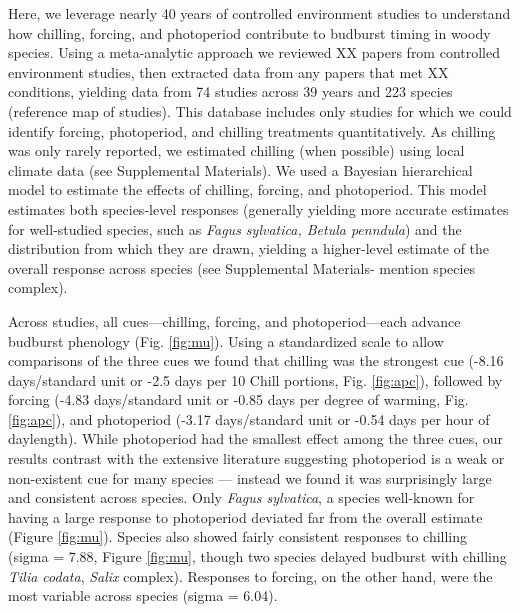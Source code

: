 \documentclass{article}
\begin{document}
\par Here, we leverage nearly 40 years of controlled environment studies to understand how chilling, forcing, and photoperiod contribute to budburst timing in woody species. Using a meta-analytic approach we reviewed XX papers from controlled environment studies, then extracted data from any papers that met XX conditions, yielding data from 74 studies across 39 years and 223 species (reference map of studies).  This database includes only studies for which we could identify forcing, photoperiod, and chilling treatments quantitatively. As chilling was only rarely reported, we estimated chilling (when possible) using local climate data (see Supplemental Materials). We used a Bayesian hierarchical model to estimate the effects of chilling, forcing, and photoperiod. This model estimates both species-level responses (generally yielding more accurate estimates for well-studied species, such as \emph{Fagus sylvatica, Betula penndula}) and the distribution from which they are drawn, yielding a higher-level estimate of the overall response across species (see Supplemental Materials- mention species complex).\\ %


\par Across studies, all cues---chilling, forcing, and photoperiod---each advance budburst phenology (Fig. \ref {fig:mu}). Using a standardized scale to allow comparisons of the three cues we found that chilling was the strongest cue (-8.16 days/standard unit or -2.5 days per 10 Chill portions, Fig. \ref {fig:apc}), followed by forcing (-4.83 days/standard unit or -0.85 days per degree of warming, Fig. \ref {fig:apc}), and photoperiod (-3.17 days/standard unit or -0.54 days per hour of daylength). While photoperiod had the smallest effect among the three cues, our results contrast with the extensive literature suggesting photoperiod is a weak or non-existent cue for many species \citep{zohner2016,koerner2010a}--- instead we found it was surprisingly large and consistent across species. Only \emph{Fagus sylvatica}, a species well-known for having a large response to photoperiod deviated far from the overall estimate (Figure \ref {fig:mu}). Species also showed fairly consistent responses to chilling (sigma = 7.88, Figure \ref {fig:mu}, though two species delayed budburst with chilling \emph{Tilia codata}, \emph{Salix} complex). Responses to forcing, on the other hand, were the most variable across species (sigma = 6.04).
\end{document}
